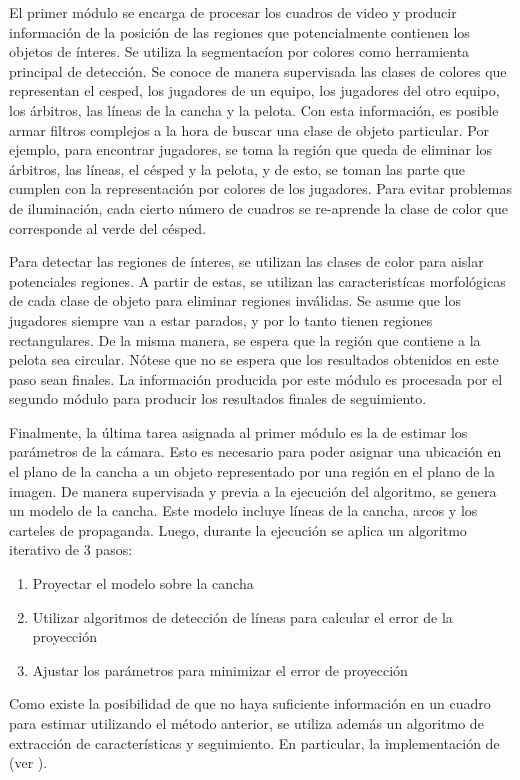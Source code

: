 \documentclass[a4paper,10pt]{article}
\begin{document}
El primer módulo se encarga de procesar los cuadros de video y producir información
de la posición de las regiones que potencialmente contienen los objetos de ínteres.
Se utiliza la segmentacíon por colores como herramienta principal de detección.
Se conoce de manera supervisada las clases de colores que representan el cesped, los jugadores de un equipo,
los jugadores del otro equipo, los árbitros, las líneas de la cancha y la pelota.
Con esta información, es posible armar filtros complejos a la hora de buscar una clase de objeto particular.
Por ejemplo, para encontrar jugadores, se toma la región que queda de
eliminar los árbitros, las líneas, el césped y la pelota,
y de esto, se toman las parte que cumplen con la representación por colores de los jugadores.
Para evitar problemas de iluminación, cada cierto número de cuadros se re-aprende la clase de color
que corresponde al verde del césped.

Para detectar las regiones de ínteres, se utilizan las clases de color para aislar potenciales regiones.
A partir de estas, se utilizan las caracteristícas morfológicas de cada clase de objeto para eliminar regiones
inválidas. Se asume que los jugadores siempre van a estar parados, y por lo tanto tienen regiones rectangulares.
De la misma manera, se espera que la región que contiene a la pelota sea circular.
Nótese que no se espera que los resultados obtenidos en este paso sean finales.
La información producida por este módulo es procesada por el segundo módulo para producir los resultados finales de
seguimiento.

Finalmente, la última tarea asignada al primer módulo es la de estimar los parámetros de la cámara.
Esto es necesario para poder asignar una ubicación en el plano de la cancha a un objeto representado
por una región en el plano de la imagen.
De manera supervisada y previa a la ejecución del algoritmo, se genera un modelo de la cancha.
Este modelo incluye líneas de la cancha, arcos y los carteles de propaganda.
Luego, durante la ejecución se aplica un algoritmo iterativo de 3 pasos:
\begin{enumerate}
\item Proyectar el modelo sobre la cancha
\item Utilizar algoritmos de detección de líneas para calcular el error de la proyección
\item Ajustar los parámetros para minimizar el error de proyección
\end{enumerate}

Como existe la posibilidad de que no haya suficiente información en un cuadro para estimar
utilizando el método anterior, se utiliza además un algoritmo de extracción de características y seguimiento.
En particular, la implementación de \citeauthor{shi-tomasi-tracking} (ver \cite{shi-tomasi-tracking}).
\end{document}
